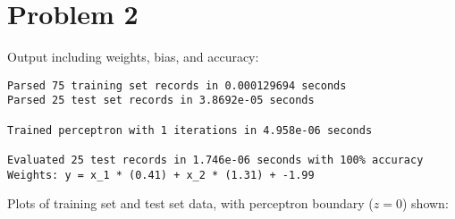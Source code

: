 \documentclass[a4paper]{article}
\begin{document}
\section*{Problem 2}

Output including weights, bias, and accuracy:\\
\begin{lstlisting}
Parsed 75 training set records in 0.000129694 seconds
Parsed 25 test set records in 3.8692e-05 seconds

Trained perceptron with 1 iterations in 4.958e-06 seconds

Evaluated 25 test records in 1.746e-06 seconds with 100% accuracy
Weights: y = x_1 * (0.41) + x_2 * (1.31) + -1.99
\end{lstlisting}

\vspace{1em}
\noindent Plots of training set and test set data, with perceptron boundary ($z=0$) shown:

\begin{figure}[ht]
  \centering
  
\end{figure}

\begin{figure}[ht]
  \centering
  
\end{figure}
\end{document}
